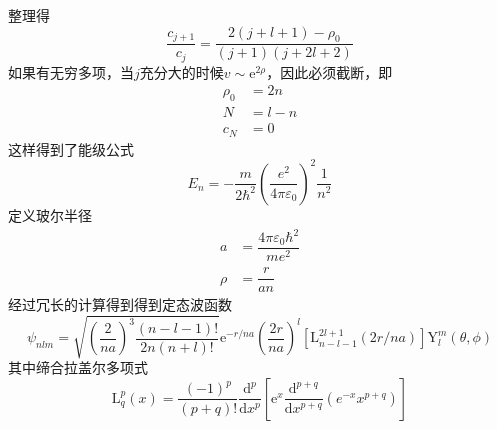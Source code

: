 \documentclass[12pt, a4paper, oneside]{ctexart}
\begin{document}
	\quad\quad 整理得
	\begin{equation}
		\dfrac{c_{j+1}}{c_{j}}=\dfrac{2\left(j+l+1\right)-\rho_{0}}{\left(j+1\right)\left(j+2l+2\right)}
	\end{equation}
	\quad\quad 如果有无穷多项，当$j$充分大的时候$v\sim\mathrm{e}^{2\rho}$，因此必须截断，即
	\begin{align}
		\rho_{0}&=2n\\
		N&=l-n\\
		c_{N}&=0
	\end{align}
	\quad\quad 这样得到了能级公式
	\begin{equation}
		E_{n}=-\dfrac{m}{2\hbar^{2}}\left(\dfrac{e^{2}}{4\pi\varepsilon_{0}}\right)^{2}\dfrac{1}{n^{2}}
	\end{equation}
	\quad\quad 定义玻尔半径
	\begin{align}
		a&=\dfrac{4\pi\varepsilon_{0}\hbar^{2}}{me^{2}}\\
		\rho&=\dfrac{r}{an}
	\end{align}
	\quad\quad 经过冗长的计算得到得到定态波函数
	\begin{equation}
		\psi_{nlm}=\sqrt{\left(\frac{2}{n a}\right)^{3} \frac{(n-l-1)!}{2 n(n+l)!}} \mathrm{e}^{-r / n a}\left(\frac{2 r}{n a}\right)^{l}\left[\mathrm{L}_{n-l-1}^{2 l+1}(2 r / n a)\right] \mathrm{Y}_{l}^{m}(\theta, \phi)
	\end{equation}
	\quad\quad 其中缔合拉盖尔多项式
	\begin{equation}
		\mathrm{L}^{p}_{q}(x)=\dfrac{(-1)^{p}}{(p+q)!}\dfrac{\mathrm{d}^{p}}{\mathrm{d}x^{p}}\left[\mathrm{e}^{x}\dfrac{\mathrm{d}^{p+q}}{\mathrm{d}x^{p+q}}\left(e^{-x}x^{p+q}\right)\right]
	\end{equation}
\end{document}
